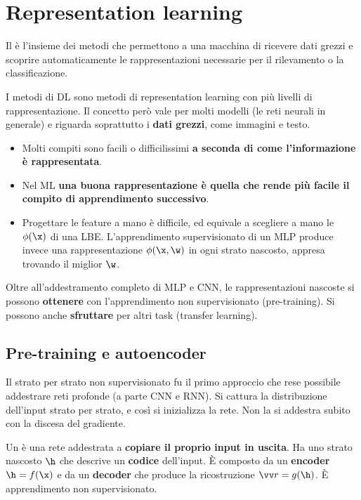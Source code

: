 \section{Representation learning}
\label{sec:representation}

\begin{definizione}
Il  è l'insieme dei metodi che permettono a una macchina di ricevere dati grezzi e
scoprire automaticamente le rappresentazioni necessarie per il rilevamento o la classificazione.
\end{definizione}

I metodi di DL sono metodi di representation learning con più livelli di rappresentazione. Il concetto però vale per
molti modelli (le reti neurali in generale) e riguarda soprattutto i \textbf{dati grezzi}, come immagini e testo.
\begin{itemize}
  \item Molti compiti sono facili o difficilissimi \textbf{a seconda di come l'informazione è rappresentata}.
  \item Nel ML \textbf{una buona rappresentazione è quella che rende più facile il compito di apprendimento
        successivo}.
  \item Progettare le feature a mano è difficile, ed equivale a scegliere a mano le $\phi(\x)$ di una LBE.
        L'apprendimento supervisionato di un MLP produce invece una rappresentazione $\phi(\x,\w)$ in ogni strato
        nascosto, appresa trovando il miglior $\w$.
\end{itemize}
Oltre all'addestramento completo di MLP e CNN, le rappresentazioni nascoste si possono \textbf{ottenere} con
l'apprendimento non supervisionato (pre-training). Si possono anche \textbf{sfruttare} per altri task (transfer
learning).

\subsection{Pre-training e autoencoder}

Il  strato per strato non supervisionato fu il primo approccio che rese possibile addestrare
reti profonde (a parte CNN e RNN). Si cattura la distribuzione dell'input strato per strato, e così si inizializza
la rete. Non la si addestra subito  con la discesa del gradiente.

\begin{definizione}[Autoencoder]
Un  è una rete addestrata a \textbf{copiare il proprio input in uscita}. Ha uno strato nascosto
$\h$ che descrive un \textbf{codice} dell'input. È composto da un \textbf{encoder} $\h = f(\x)$ e da un
\textbf{decoder} che produce la ricostruzione $\vv r = g(\h)$. È apprendimento non supervisionato.
\end{definizione}

